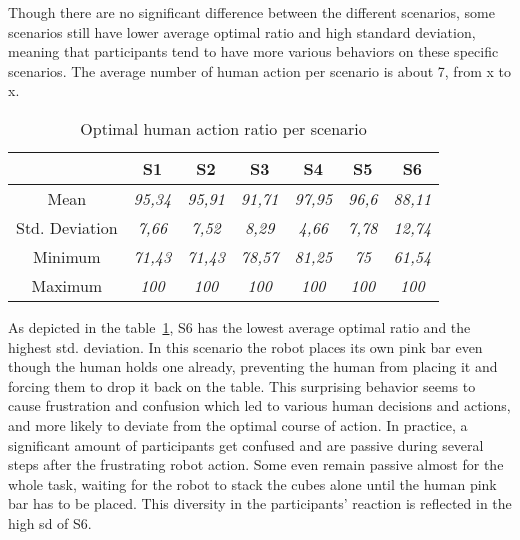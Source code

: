 Though there are no significant difference between the different scenarios, some scenarios still have lower average optimal ratio and high standard deviation, meaning that participants tend to have more various behaviors on these specific scenarios. 
The average number of human action per scenario is about 7, from x to x. 

\begin{table}[h]
    \center
    \begin{tabular}{c|c|c|c|c|c|c|}
    \cline{2-7}
    \textbf{}                            & S1             & S2             & S3             & S4             & S5            & S6             \\ \hline
    \multicolumn{1}{|c|}{Mean}           & \textit{95,34} & \textit{95,91} & \textit{91,71} & \textit{97,95} & \textit{96,6} & \textit{88,11} \\ \hline
    \multicolumn{1}{|c|}{Std. Deviation} & \textit{7,66}  & \textit{7,52}  & \textit{8,29}  & \textit{4,66}  & \textit{7,78} & \textit{12,74} \\ \hline
    \multicolumn{1}{|c|}{Minimum}        & \textit{71,43} & \textit{71,43} & \textit{78,57} & \textit{81,25} & \textit{75}   & \textit{61,54} \\ \hline
    \multicolumn{1}{|c|}{Maximum}        & \textit{100}   & \textit{100}   & \textit{100}   & \textit{100}   & \textit{100}  & \textit{100}   \\ \hline
    \end{tabular}
    \caption{Optimal human action ratio per scenario}
    \label{tab:optimal_human_ratio}
    \end{table}



As depicted in the table~\ref{tab:optimal_human_ratio}, 
S6 has the lowest average optimal ratio and the highest std. deviation. In this scenario the robot places its own pink bar even though the human holds one already, preventing the human from placing it and forcing them to drop it back on the table. This surprising behavior seems to cause frustration and confusion which led to various human decisions and actions, and more likely to deviate from the optimal course of action. In practice, a significant amount of participants get confused and are passive during several steps after the frustrating robot action. Some even remain passive almost for the whole task, waiting for the robot to stack the cubes alone until the human pink bar has to be placed. This diversity in the participants' reaction is reflected in the high sd of S6.

